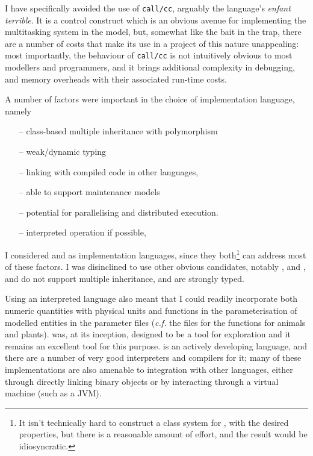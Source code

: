 I have specifically avoided the use of \texttt{call/cc}, arguably the
language's \emph{enfant terrible}. It is a control construct which is
an obvious avenue for implementing the multitasking system in the
model, but, somewhat like the bait in the trap, there are a number of
costs that make its use in a project of this nature unappealing: most
importantly, the behaviour of \texttt{call/cc} is not intuitively
obvious to most modellers and programmers, and it brings additional
complexity in debugging, and memory overheads with their associated
run-time costs.

A number of factors were important in the choice of implementation
language, namely
\begin{itemize}
\item[--] class-based multiple inheritance with polymorphism\\
\item[--] weak/dynamic typing\\
\item[--] linking with compiled code in other languages,\\
\item[--] able to support maintenance models\\
\item[--] potential for parallelising and distributed execution.\\
\item[--] interpreted operation if possible,
\end{itemize}

I considered \Cpp and \CC as implementation languages, since they
both\footnote{It isn't technically hard to construct a class system
for \CC, with the desired properties, but there is a reasonable amount
of effort, and the result would be idiosyncratic.} can address most of
these factors. I was disinclined to use other obvious candidates,
notably \Java, and \Csharp, and \DD do not support multiple
inheritance, and are strongly typed.

Using an interpreted language also meant that I could readily
incorporate both numeric quantities with physical units and functions
in the parameterisation of modelled entities in the parameter files
(\emph{c.f.}  the files for the
 functions for animals and plants). \Scheme was,
at its inception, designed to be a tool for exploration
\cite{sussman1998first} and it remains an excellent tool for this
purpose. \Scheme is an actively developing language, and there are a
number of very good interpreters and compilers for it; many of these
implementations are also amenable to integration with other languages,
either through directly linking binary objects or by interacting
through a virtual machine (such as a JVM).

